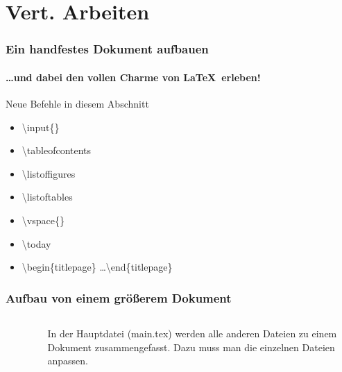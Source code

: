 \section{Vert. Arbeiten}
\begin{frame}
\frametitle{Ein handfestes Dokument aufbauen}
\framesubtitle{\ldots und dabei den vollen Charme von \LaTeX ~erleben!}
\begin{block}{Neue Befehle in diesem Abschnitt}
\begin{itemize}
  \item \color{nounibaredI}\textbackslash input\color{black}\{\}
  \item \color{nounibaredI}\textbackslash tableofcontents\color{black}
  \item \color{nounibaredI}\textbackslash listoffigures\color{black}
  \item \color{nounibaredI}\textbackslash listoftables\color{black}
  \item \color{nounibaredI}\textbackslash vspace\color{black}\{\}
  \item \color{nounibaredI}\textbackslash today\color{black}
\item \color{unibablueI}\textbackslash begin\color{black}\{titlepage\} \ldots \color{unibablueI}\textbackslash end\color{black}\{titlepage\} 
\end{itemize}
\end{block}
\end{frame}


\begin{frame}
\frametitle{Aufbau von einem gr\"o\ss erem Dokument}

\begin{columns}
\begin{column}{.5\textwidth}
\footnotesize
\begin{figure}[t]
\end{figure}
\end{column}
\begin{column}{.5\textwidth}
In der Hauptdatei (main.tex) werden alle anderen Dateien zu einem Dokument zusammengefasst. 
Dazu muss man die einzelnen Dateien anpassen.
\end{column}
\end{columns}
\end{frame}

